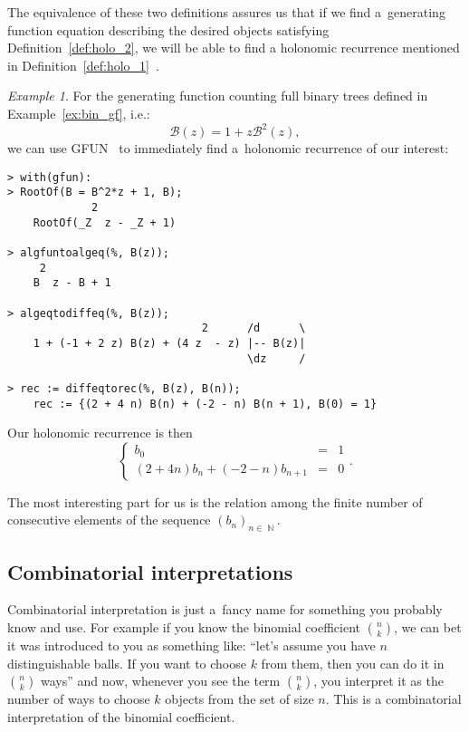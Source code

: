 \documentclass[final]{article}
\theoremstyle{definition}
\theoremstyle{definition}
\theoremstyle{remark}
\newtheorem{example}{Example}[subsection]
\newcommand{\gf}[1]{\ensuremath{\mathcal{#1}}}
\DeclareMathOperator{\N}{\mathbb{N}}
\begin{document}
The equivalence of these two definitions assures us that if we find a~generating function equation describing the desired objects satisfying Definition~\ref{def:holo_2}, we will be able to find a holonomic recurrence mentioned in Definition~\ref{def:holo_1}~\cite{complexity}.

\begin{example}%
    \label{ex:gfun-rec}
    For the generating function counting full binary trees defined in Example~\ref{ex:bin_gf}, i.e.:
    \[\gf{B}(z) = 1 + z\gf{B}^2(z),\]
    we can use GFUN~\cite{gfun} to immediately find a~holonomic recurrence of our interest:

    \begin{lstlisting}
> with(gfun):
> RootOf(B = B^2*z + 1, B);
             2
    RootOf(_Z  z - _Z + 1)

> algfuntoalgeq(%, B(z));
     2
    B  z - B + 1

> algeqtodiffeq(%, B(z));
                              2      /d      \
    1 + (-1 + 2 z) B(z) + (4 z  - z) |-- B(z)|
                                     \dz     /

> rec := diffeqtorec(%, B(z), B(n));
    rec := {(2 + 4 n) B(n) + (-2 - n) B(n + 1), B(0) = 1}
    \end{lstlisting}

    Our holonomic recurrence is then
    \[\left\{\begin{array}{rcl}
                b_0 &=& 1\\
                (2 + 4 n) b_n + (-2 - n) b_{n + 1} &=& 0
    \end{array}\right..\]

    The most interesting part for us is the relation among the finite number of consecutive elements of the sequence \((b_n)_{n \in \N}\).
\end{example}

\subsection{Combinatorial interpretations}%
\label{sub:combinatorial_interpretations}

Combinatorial interpretation is just a~fancy name for something you probably know and use. For example if you know the binomial coefficient \(\binom{n}{k}\), we can bet it was introduced to you as something like: ``let's assume you have \(n\) distinguishable balls. If you want to choose \(k\) from them, then you can do it in \(\binom{n}{k}\) ways'' and now, whenever you see the term \(\binom{n}{k}\), you interpret it as the number of ways to choose \(k\) objects from the set of size \(n\). This is a combinatorial interpretation of the binomial coefficient.
\end{document}
